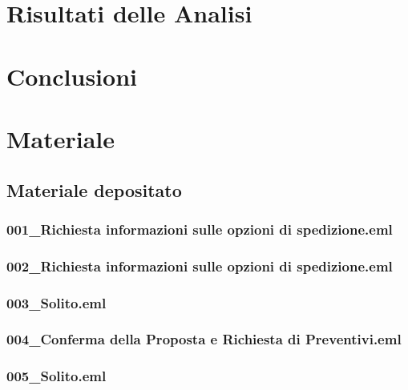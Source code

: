 \documentclass[a4paper,12pt]{report}
\begin{document}
\pagebreak

\chapter{Risultati delle Analisi}


\pagebreak

\chapter{Conclusioni}


\pagebreak

\chapter{Materiale}
\section{Materiale depositato} \label{usb}

\subsection{001\_Richiesta informazioni sulle opzioni di spedizione.eml} \label{email1}
\vspace{5pt}


\subsection{002\_Richiesta informazioni sulle opzioni di spedizione.eml} \label{email2}
\vspace{5pt}


\subsection{003\_Solito.eml} \label{email3}
\vspace{5pt}


\subsection{004\_Conferma della Proposta e Richiesta di Preventivi.eml} \label{email4}
\vspace{5pt}


\subsection{005\_Solito.eml} \label{email5}
\vspace{5pt}

\end{document}

